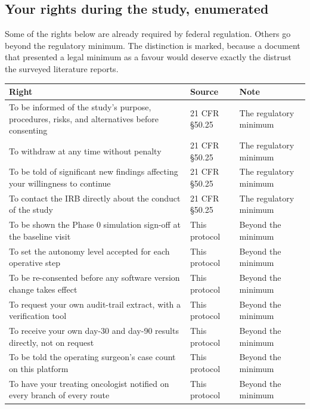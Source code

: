 \vspace{0.30em}

\subsection{Your rights during the study, enumerated}

Some of the rights below are already required by federal regulation. Others go
beyond the regulatory minimum. The distinction is marked, because a document
that presented a legal minimum as a favour would deserve exactly the distrust
the surveyed literature reports.

\vspace{0.30em}

\noindent\begin{tabularx}{\textwidth}{L{5.4cm} C{2.3cm} Y}
\toprule
\textbf{Right} & \textbf{Source} & \textbf{Note} \\
\midrule
To be informed of the study's purpose, procedures, risks, and alternatives before consenting & 21 CFR \S 50.25 & The regulatory minimum \cite{ecfr2026part50, NCIConsent24} \\
To withdraw at any time without penalty & 21 CFR \S 50.25 & The regulatory minimum \\
To be told of significant new findings affecting your willingness to continue & 21 CFR \S 50.25 & The regulatory minimum \\
To contact the IRB directly about the conduct of the study & 21 CFR \S 50.25 & The regulatory minimum \\
To be shown the Phase 0 simulation sign-off at the baseline visit & This protocol & Beyond the minimum \\
To set the autonomy level accepted for each operative step & This protocol & Beyond the minimum \\
To be re-consented before any software version change takes effect & This protocol & Beyond the minimum \\
To request your own audit-trail extract, with a verification tool & This protocol & Beyond the minimum \\
To receive your own day-30 and day-90 results directly, not on request & This protocol & Beyond the minimum \\
To be told the operating surgeon's case count on this platform & This protocol & Beyond the minimum \\
To have your treating oncologist notified on every branch of every route & This protocol & Beyond the minimum \\
\bottomrule
\end{tabularx}

